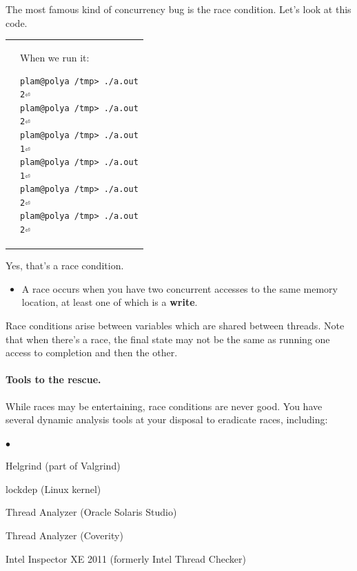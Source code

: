 \documentclass[11pt]{article}
\newcommand{\squishlist}{
 \begin{list}{$\bullet$}
  { \setlength{\itemsep}{0pt}
     \setlength{\parsep}{3pt}
     \setlength{\topsep}{3pt}
     \setlength{\partopsep}{0pt}
     \setlength{\leftmargin}{1.5em}
     \setlength{\labelwidth}{1em}
     \setlength{\labelsep}{0.5em} } }
\newcommand{\squishend}{
  \end{list}  }
\begin{document}
The most famous kind of concurrency bug is the race condition. Let's look at this code.

\begin{tabular}{ll}
  \begin{minipage}{.5\textwidth}
  
\end{minipage} &\begin{minipage}{.5\textwidth} When we run it:
{\small \begin{verbatim}
plam@polya /tmp> ./a.out
2⏎
plam@polya /tmp> ./a.out
2⏎
plam@polya /tmp> ./a.out
1⏎
plam@polya /tmp> ./a.out
1⏎
plam@polya /tmp> ./a.out
2⏎
plam@polya /tmp> ./a.out
2⏎
\end{verbatim} }
  \end{minipage}
\end{tabular}

Yes, that's a race condition.

\begin{itemize}
    \item A race occurs when you have two concurrent accesses to the
      same memory location, at least one of which is a {\bf write}.
\end{itemize}

Race conditions arise between variables which are shared between
threads.  Note that when there's a race, the final state may not be
the same as running one access to completion and then the other.

\paragraph{Tools to the rescue.} While races may be entertaining, race conditions are never good.
You have several dynamic analysis tools at your disposal to eradicate races, including:

\squishlist
    \item Helgrind (part of Valgrind)
    \item lockdep (Linux kernel)
    \item Thread Analyzer (Oracle Solaris Studio)
    \item Thread Analyzer (Coverity)
    \item Intel Inspector XE 2011 (formerly Intel Thread Checker)
\squishend
\end{document}
